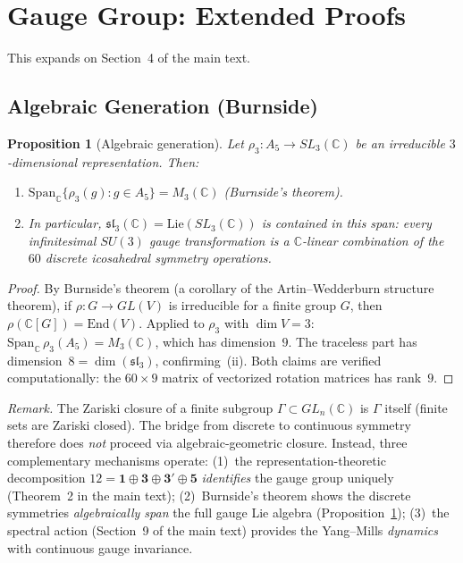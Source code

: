 \documentclass[12pt,a4paper]{article}
\newtheorem{proposition}{Proposition}
\theoremstyle{definition}
\begin{document}
\section{Gauge Group: Extended Proofs}
\label{sec:S-gauge}

This expands on Section~4 of the main text.

\subsection{Algebraic Generation (Burnside)}

\begin{proposition}[Algebraic generation]\label{prop:S-burnside}
Let $\rho_3: A_5 \to SL_3(\mathbb{C})$ be an irreducible $3$-dimensional representation.  Then:
\begin{enumerate}
\item[(i)] $\mathrm{Span}_{\mathbb{C}}\{\rho_3(g) : g \in A_5\} = M_3(\mathbb{C})$ \textup{(Burnside's theorem)}.
\item[(ii)] In particular, $\mathfrak{sl}_3(\mathbb{C}) = \mathrm{Lie}(SL_3(\mathbb{C}))$ is contained in this span: every infinitesimal $SU(3)$ gauge transformation is a $\mathbb{C}$-linear combination of the $60$ discrete icosahedral symmetry operations.
\end{enumerate}
\end{proposition}

\begin{proof}
By Burnside's theorem (a corollary of the Artin--Wedderburn structure theorem), if $\rho: G \to GL(V)$ is irreducible for a finite group $G$, then $\rho(\mathbb{C}[G]) = \mathrm{End}(V)$.  Applied to $\rho_3$ with $\dim V = 3$: $\mathrm{Span}_{\mathbb{C}}\,\rho_3(A_5) = M_3(\mathbb{C})$, which has dimension~$9$.  The traceless part has dimension~$8 = \dim(\mathfrak{sl}_3)$, confirming~(ii).  Both claims are verified computationally: the $60 \times 9$ matrix of vectorized rotation matrices has rank~$9$.
\end{proof}

\noindent\textit{Remark.}  The Zariski closure of a finite subgroup $\Gamma \subset GL_n(\mathbb{C})$ is $\Gamma$ itself (finite sets are Zariski closed).  The bridge from discrete to continuous symmetry therefore does \emph{not} proceed via algebraic-geometric closure.  Instead, three complementary mechanisms operate: (1)~the representation-theoretic decomposition $12 = \mathbf{1} \oplus \mathbf{3} \oplus \mathbf{3'} \oplus \mathbf{5}$ \emph{identifies} the gauge group uniquely (Theorem~2 in the main text); (2)~Burnside's theorem shows the discrete symmetries \emph{algebraically span} the full gauge Lie algebra (Proposition~\ref{prop:S-burnside}); (3)~the spectral action (Section~9 of the main text) provides the Yang--Mills \emph{dynamics} with continuous gauge invariance.
\end{document}
